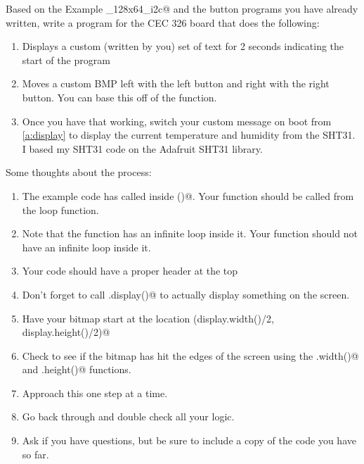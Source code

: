 Based on the Example _128x64_i2c@ and the button programs you have already written, write a 
program for the CEC 326 board that does the following:
\begin{enumerate}
	\item \label{a:display}Displays a custom (written by you) set of text for 2 seconds indicating the start of the program
	\item Moves a custom BMP left with the left button and right with the right button. You can base this 
			off of the \lstinline@testanimate@ function. 
	\item Once you have that working, switch your custom message on boot from \ref{a:display} to display the current
			temperature and humidity from the SHT31. I based my SHT31 code on the Adafruit SHT31 library.
\end{enumerate}
Some thoughts about the process:
\begin{enumerate}
	\item The example code has \lstinline@testanimate@ called inside \lstinline@setup()@. Your function should be called from 
			the loop function. 
	\item Note that the \lstinline@testanimate@ function has an infinite loop inside it. Your function should not 
			have an infinite loop inside it.
	\item Your code should have a proper header at the top
	\item Don't forget to call \lstinline@display.display()@ to actually display something on the screen.
	\item Have your bitmap start at the location \lstinline@(display.width()/2, display.height()/2)@
	\item Check to see if the bitmap has hit the edges of the screen using the \lstinline@display.width()@ and 
			\lstinline@display.height()@ functions.
	\item Approach this one step at a time.
	\item Go back through and double check all your logic.
	\item Ask if you have questions, but be sure to include a copy of the code you have so far.
\end{enumerate}

